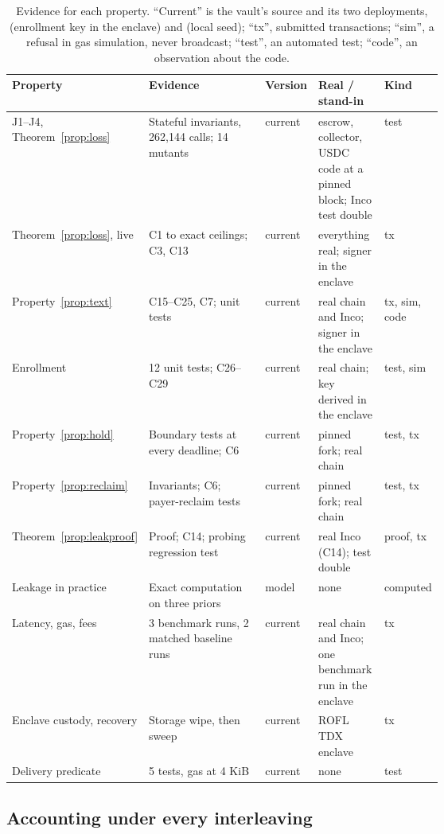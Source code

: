 \begin{table}[t]
\centering\small
\begin{tabularx}{\linewidth}{@{}L{0.19\linewidth}L{0.27\linewidth}L{0.09\linewidth}XL{0.08\linewidth}@{}}
\toprule
Property & Evidence & Version & Real / stand-in & Kind \\
\midrule
J1--J4, Theorem~\ref{prop:loss} & Stateful invariants, 262{,}144 calls; 14 mutants & current & escrow, collector, USDC code at a pinned block; Inco test double & test \\
Theorem~\ref{prop:loss}, live & C1 to exact ceilings; C3, C13 & current & everything real; signer in the enclave & tx \\
Property~\ref{prop:text} & C15--C25, C7; unit tests & current & real chain and Inco; signer in the enclave & tx, sim, code \\
Enrollment & 12 unit tests; C26--C29 & current & real chain; key derived in the enclave & test, sim \\
Property~\ref{prop:hold} & Boundary tests at every deadline; C6 & current & pinned fork; real chain & test, tx \\
Property~\ref{prop:reclaim} & Invariants; C6; payer-reclaim tests & current & pinned fork; real chain & test, tx \\
Theorem~\ref{prop:leakproof} & Proof; C14; probing regression test & current & real Inco (C14); test double & proof, tx \\
Leakage in practice & Exact computation on three priors & model & none & computed \\
Latency, gas, fees & 3 benchmark runs, 2 matched baseline runs & current & real chain and Inco; one benchmark run in the enclave & tx \\
Enclave custody, recovery & Storage wipe, then sweep & current & ROFL TDX enclave & tx \\
Delivery predicate & 5 tests, gas at 4 KiB & current & none & test \\
\bottomrule
\end{tabularx}
\caption{Evidence for each property. ``Current'' is the vault's source and its two deployments,  (enrollment key in the
enclave) and  (local seed); ``tx'', submitted transactions;
``sim'', a refusal in gas simulation, never broadcast; ``test'', an automated test; ``code'', an observation about the code.}
\label{tab:matrix}
\end{table}

\subsection{Accounting under every interleaving}
\label{sec:invariants}

